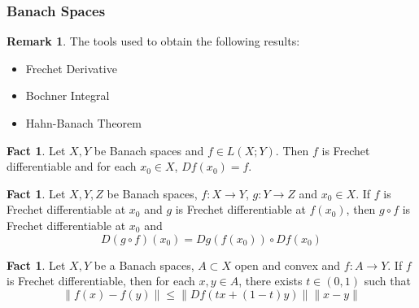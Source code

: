 \documentclass[notheorems]{beamer}
\theoremstyle{definition}
\newtheorem{fact}[definition]{Fact}
\newtheorem{rem}[definition]{Remark}
\begin{document}
\begin{frame}
\frametitle{Banach Spaces}

\begin{rem}
The tools used to obtain the following results: 
\begin{itemize}
\item Frechet Derivative
\item Bochner Integral
\item Hahn-Banach Theorem  
\end{itemize}
\end{rem}

\begin{fact}
Let $X,Y$ be Banach spaces and $f \in L(X;Y)$. Then $f$ is Frechet differentiable and for each $x_0 \in X$, $Df(x_0) = f$. 
\end{fact}
\pause

\begin{fact}
Let $X,Y, Z$ be Banach spaces, $f:X \rightarrow Y$, $g :Y \rightarrow Z$ and $x_0 \in X$. If $f$ is Frechet differentiable at $x_0$ and $g$ is Frechet differentiable at $f(x_0)$, then $g \circ f$ is Frechet differentiable at $x_0$ and $$D(g \circ f)(x_0) = Dg(f(x_0)) \circ Df(x_0)$$
\end{fact}
\pause

\begin{fact}
Let $X, Y$ be a Banach spaces, $A \subset X$ open and convex and $f:A \rightarrow Y$. If $f$ is Frechet differentiable, then for each $x,y \in A$, there exists $t \in (0,1)$ such that $$\|f(x) - f(y)\| \leq \|Df(tx + (1-t)y)\|\|x-y\|$$
\end{fact}


\end{frame}
\end{document}
